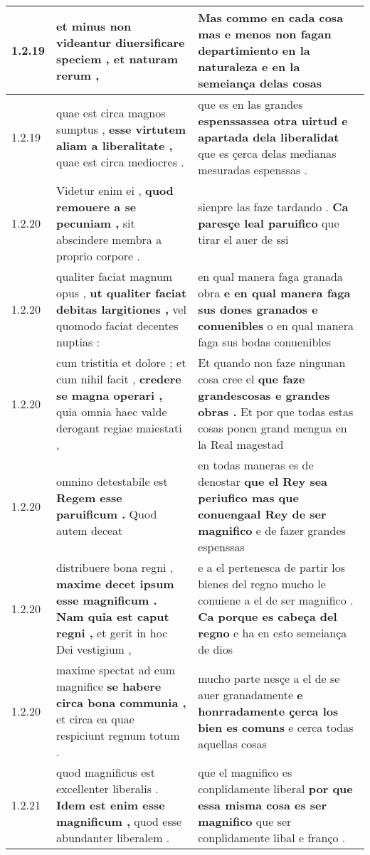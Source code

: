 \begin{tabular}{|p{1cm}|p{6.5cm}|p{6.5cm}|}
1.2.19 & et minus non videantur \textbf{ diuersificare speciem , } et naturam rerum , & Mas commo en cada cosa \textbf{ mas e menos non fagan departimiento en la naturaleza } e en la semeiança delas cosas \\\hline
1.2.19 & quae est circa magnos sumptus , \textbf{ esse virtutem aliam a liberalitate , } quae est circa mediocres . & que es en las grandes \textbf{ espenssassea otra uirtud e apartada dela liberalidat } que es çerca delas medianas mesuradas espenssas . \\\hline
1.2.20 & Videtur enim ei , \textbf{ quod remouere a se pecuniam , } sit abscindere membra a proprio corpore . & sienpre las faze tardando . \textbf{ Ca paresçe leal paruifico } que tirar el auer de ssi \\\hline
1.2.20 & qualiter faciat magnum opus , \textbf{ ut qualiter faciat debitas largitiones , } vel quomodo faciat decentes nuptias : & en qual manera faga granada obra \textbf{ e en qual manera faga sus dones granados e conuenibles } o en qual manera faga sus bodas conuenibles \\\hline
1.2.20 & cum tristitia et dolore ; et cum nihil facit , \textbf{ credere se magna operari , } quia omnia haec valde derogant regiae maiestati , & Et quando non faze ningunan cosa cree el \textbf{ que faze grandescosas e grandes obras . } Et por que todas estas cosas ponen grand mengua en la Real magestad \\\hline
1.2.20 & omnino detestabile est \textbf{ Regem esse paruificum . } Quod autem deceat & en todas maneras es de denostar \textbf{ que el Rey sea periufico mas que conuengaal Rey de ser magnifico } e de fazer grandes espenssas \\\hline
1.2.20 & distribuere bona regni , \textbf{ maxime decet ipsum esse magnificum . Nam quia est caput regni , } et gerit in hoc Dei vestigium , & e a el pertenesca de partir los bienes del regno mucho le conuiene a el de ser magnifico . \textbf{ Ca porque es cabeça del regno } e ha en esto semeiança de dios \\\hline
1.2.20 & maxime spectat ad eum magnifice \textbf{ se habere circa bona communia , } et circa ea quae respiciunt regnum totum . & mucho parte nesçe a el de se auer granadamente \textbf{ e honrradamente çerca los bien es comuns } e cerca todas aquellas cosas \\\hline
1.2.21 & quod magnificus est excellenter liberalis . \textbf{ Idem est enim esse magnificum , } quod esse abundanter liberalem . & que el magnifico es conplidamente liberal \textbf{ por que essa misma cosa es ser magnifico } que ser conplidamente libal e franço . \\\hline

\end{tabular}
